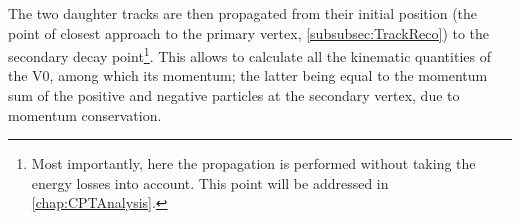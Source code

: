 
The two daughter tracks are then propagated from their initial position (the point of closest approach to the primary vertex, \Sec\ref{subsubsec:TrackReco}) to the secondary decay point\footnote{Most importantly, here the propagation is performed without taking the energy losses into account. This point will be addressed in \chap\ref{chap:CPTAnalysis}\label{footnote:EnergyLossV0CascVertexing}.}. This allows to calculate all the kinematic quantities of the V0, among which its momentum; the latter being equal to the momentum sum of the positive and negative particles at the secondary vertex, due to momentum conservation.

